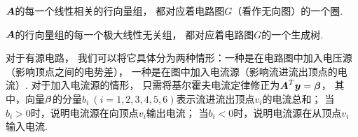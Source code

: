 \begin{example}
\(\boldsymbol{A}\)的每一个线性相关的行向量组，
都对应着电路图\(G\)（看作无向图）的一个圈.

\(\boldsymbol{A}\)的行向量组的每一个极大线性无关组，
都对应着电路图\(G\)的一个生成树.

对于有源电路，
我们可以将它具体分为两种情形：一种是在电路图中加入电压源（影响顶点之间的电势差），
一种是在图中加入电流源（影响流进流出顶点的电流）.
对于加入电流源的情形，
只需将基尔霍夫电流定律修正为\(\boldsymbol{A}^T \boldsymbol{y} = \boldsymbol\beta\)，
其中，向量\(\boldsymbol\beta\)的分量\(b_i\ (i=1,2,3,4,5,6)\)表示流进流出顶点\(v_i\)的电流总和；
当\(b_i > 0\)时，说明电流源在向顶点\(v_i\)输出电流；
当\(b_i < 0\)时，说明电流源在从顶点\(v_i\)输入电流.
\end{example}
